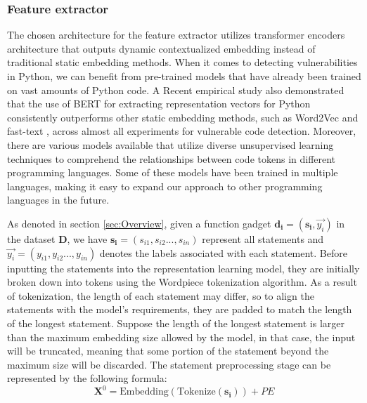 \documentclass{ieeeaccess}
\begin{document}
\subsubsection{Feature extractor} \label{sec:MFE}


\par The chosen architecture for the feature extractor utilizes transformer encoders \cite{bert} architecture that outputs dynamic contextualized embedding instead of traditional static embedding methods\cite{doc2vec,word2vec,glove, fasttext}. When it comes to detecting vulnerabilities in Python, we can benefit from pre-trained models that have already been trained on vast amounts of Python code. A Recent empirical study \cite{Embeds_comparison} also demonstrated that the use of BERT for extracting representation vectors for Python consistently outperforms other static embedding methods, such as Word2Vec \cite{word2vec} and fast-text \cite{fasttext}, across almost all experiments for vulnerable code detection. Moreover, there are various models available \cite{mpnet,minilm,codebert} that utilize diverse unsupervised learning techniques to comprehend the relationships between code tokens in different programming languages. Some of these models have been trained in multiple languages, making it easy to expand our approach to other programming languages in the future.
\par As denoted in section \ref{sec:Overview},  given a function gadget $\mathbf{d_i}=(\mathbf{s_i}, \Vec{y_i})$ in the dataset $\mathbf{D}$, we have $\mathbf{s_i}=(s_{i1},s_{i2}...,s_{in})$ represent all statements and $\Vec{y_i}=(y_{i1},y_{i2}...,y_{in})$ denotes the labels associated with each statement. Before inputting the statements into the representation learning model, they are initially broken down into tokens using the Wordpiece tokenization algorithm\cite{wordpiece}. As a result of tokenization, the length of each statement may differ, so to align the statements with the model's requirements, they are padded to match the length of the longest statement. Suppose the length of the longest statement is larger than the maximum embedding size allowed by the model, in that case, the input will be truncated, meaning that some portion of the statement beyond the maximum size will be discarded.  The statement preprocessing stage can be represented by the following formula:
\begin{equation} \label{equa:FE1}
\mathbf{X}^0=\text{Embedding}(\text{Tokenize}(\mathbf{s_{i}})) + PE\end{equation}
\end{document}
